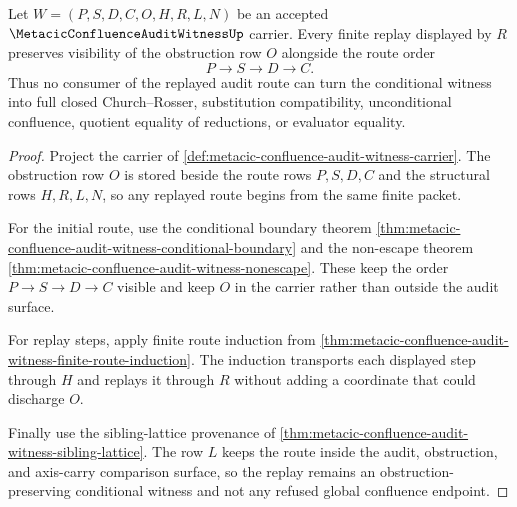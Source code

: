 \begin{theorem}
\label{thm:metacic-confluence-audit-witness-obstruction-preservation}
Let $W=(P,S,D,C,O,H,R,L,N)$ be an accepted $\MetacicConfluenceAuditWitnessUp$ carrier. Every finite replay displayed by $R$ preserves visibility of the obstruction row $O$ alongside the route order
$$
P \longrightarrow S \longrightarrow D \longrightarrow C.
$$
Thus no consumer of the replayed audit route can turn the conditional witness into full closed Church--Rosser, substitution compatibility, unconditional confluence, quotient equality of reductions, or evaluator equality.
\end{theorem}
\begin{proof}
Project the carrier of \autoref{def:metacic-confluence-audit-witness-carrier}. The obstruction row $O$ is stored beside the route rows $P,S,D,C$ and the structural rows $H,R,L,N$, so any replayed route begins from the same finite packet.

For the initial route, use the conditional boundary theorem \autoref{thm:metacic-confluence-audit-witness-conditional-boundary} and the non-escape theorem \autoref{thm:metacic-confluence-audit-witness-nonescape}. These keep the order $P \to S \to D \to C$ visible and keep $O$ in the carrier rather than outside the audit surface.

For replay steps, apply finite route induction from \autoref{thm:metacic-confluence-audit-witness-finite-route-induction}. The induction transports each displayed step through $H$ and replays it through $R$ without adding a coordinate that could discharge $O$.

Finally use the sibling-lattice provenance of \autoref{thm:metacic-confluence-audit-witness-sibling-lattice}. The row $L$ keeps the route inside the audit, obstruction, and axis-carry comparison surface, so the replay remains an obstruction-preserving conditional witness and not any refused global confluence endpoint.
\end{proof}

